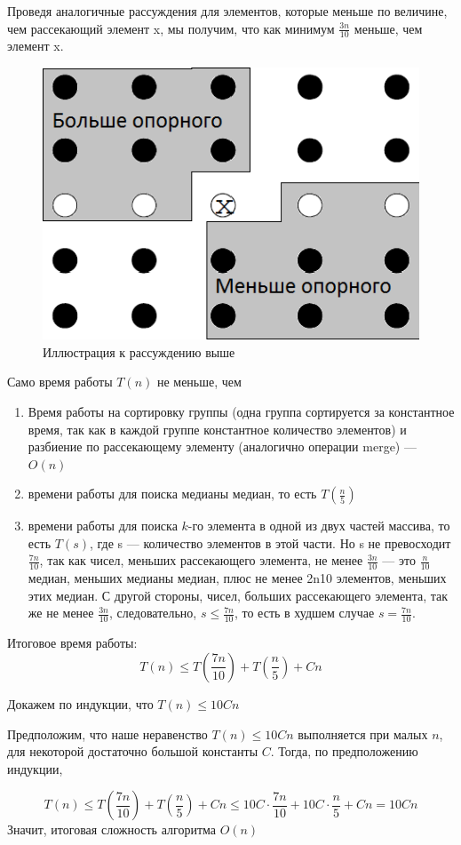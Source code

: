 Проведя аналогичные рассуждения для элементов, которые меньше по величине, чем рассекающий элемент x, мы получим, что как минимум $\frac{3n}{10}$
меньше, чем элемент x.

\begin{figure}[ht!]
	\centering
	\includegraphics[width=0.7\linewidth]{img_easy/1_1.png}
	\captionsetup{labelformat=empty}
	\caption{Иллюстрация к рассуждению выше}
\end{figure}

Само время работы $T(n)$ не меньше, чем
\begin{enumerate}
	\item Время работы на сортировку группы (одна группа сортируется за константное время, так как в каждой группе константное количество элементов) и разбиение по рассекающему элементу (аналогично операции merge) --- $O(n)$
	\item времени работы для поиска медианы медиан, то есть $T\left(\frac{n}{5}\right)$
	\item времени работы для поиска $k$-го элемента в одной из двух частей массива, то есть $T(s)$, где s --- количество элементов в этой части. Но s
	не превосходит $\frac{7n}{10}$, так как чисел, меньших рассекающего элемента, не менее $\frac{3n}{10}$ --- это $\frac{n}{10}$
	медиан, меньших медианы медиан, плюс не менее 2n10
	элементов, меньших этих медиан. С другой стороны, чисел, больших рассекающего элемента, так же не менее $\frac{3n}{10}$, следовательно, $s \leq \frac{7n}{10}$, то есть в худшем случае $s=
	\frac{7n}{10}$.
\end{enumerate}

Итоговое время работы:
\[
	T(n) \leq T\left(\frac{7n}{10}\right) + T\left(\frac{n}{5}\right) + Cn
\]

Докажем по индукции, что $T(n) \leq 10Cn$

Предположим, что наше неравенство $T(n) \leq 10Cn$ выполняется при малых $n$, для некоторой достаточно большой константы $C$. 
Тогда, по предположению индукции, 

$$
T(n) \leq T\left(\frac{7n}{10}\right) + T\left(\frac{n}{5}\right) + Cn \leq 10C \cdot \frac{7n}{10} + 10C \cdot \frac{n}{5} + Cn = 10 Cn
$$
Значит, итоговая сложность алгоритма $O(n)$